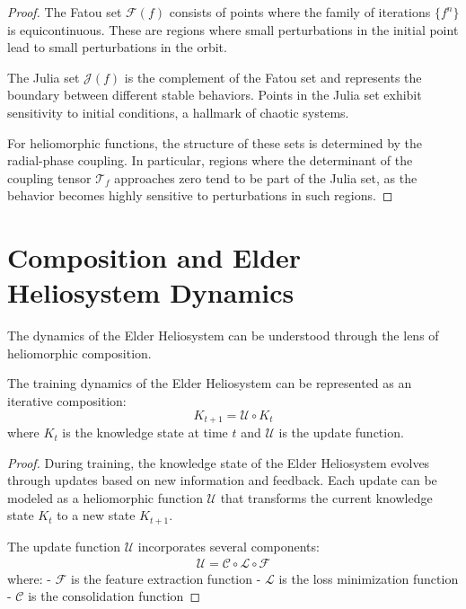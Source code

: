 \begin{definition}
\begin{enumerate}
\begin{definition}
\begin{definition}
\begin{proof}
The Fatou set $\mathcal{F}(f)$ consists of points where the family of iterations $\{f^n\}$ is equicontinuous. These are regions where small perturbations in the initial point lead to small perturbations in the orbit.

The Julia set $\mathcal{J}(f)$ is the complement of the Fatou set and represents the boundary between different stable behaviors. Points in the Julia set exhibit sensitivity to initial conditions, a hallmark of chaotic systems.

For heliomorphic functions, the structure of these sets is determined by the radial-phase coupling. In particular, regions where the determinant of the coupling tensor $\mathcal{T}_f$ approaches zero tend to be part of the Julia set, as the behavior becomes highly sensitive to perturbations in such regions.
\end{proof}

\section{Composition and Elder Heliosystem Dynamics}

The dynamics of the Elder Heliosystem can be understood through the lens of heliomorphic composition.

\begin{theorem}
The training dynamics of the Elder Heliosystem can be represented as an iterative composition:
\begin{equation}
K_{t+1} = \mathcal{U} \circ K_t
\end{equation}
where $K_t$ is the knowledge state at time $t$ and $\mathcal{U}$ is the update function.
\end{theorem}

\begin{proof}
During training, the knowledge state of the Elder Heliosystem evolves through updates based on new information and feedback. Each update can be modeled as a heliomorphic function $\mathcal{U}$ that transforms the current knowledge state $K_t$ to a new state $K_{t+1}$.

The update function $\mathcal{U}$ incorporates several components:
\begin{align}
\mathcal{U} = \mathcal{C} \circ \mathcal{L} \circ \mathcal{F}
\end{align}
where:
- $\mathcal{F}$ is the feature extraction function
- $\mathcal{L}$ is the loss minimization function
- $\mathcal{C}$ is the consolidation function


\end{proof}
\end{definition}
\end{definition}
\end{enumerate}
\end{definition}
